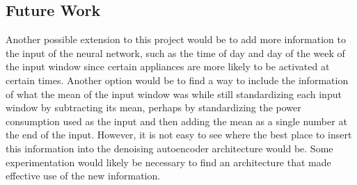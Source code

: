 \documentclass{article}
\begin{document}
\begin{figure}
  \label{fig:WasherDryer}
\end{figure}

\subsection{Future Work}

Another possible extension to this project would be to add more information to the input of the neural network, such as the time of day and day of the week of the input window since certain appliances are more likely to be activated at certain times. Another option would be to find a way to include the information of what the mean of the input window was while still standardizing each input window by subtracting its mean\cite{Kelly}, perhaps by standardizing the power consumption used as the input and then adding the mean as a single number at the end of the input. However, it is not easy to see where the best place to insert this information into the denoising autoencoder architecture would be. Some experimentation would likely be necessary to find an architecture that made effective use of the new information.




\end{document}
